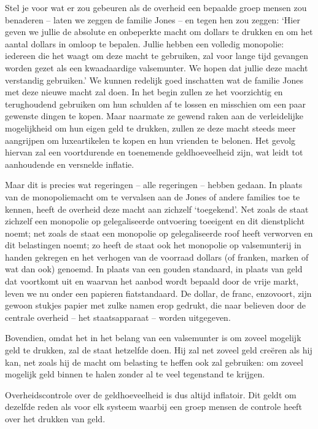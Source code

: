 \documentclass[
  a5paper,
  smalldemyvopaper,10pt,twoside,onecolumn,openright,extrafontsizes,hidelinks]{memoir}
\begin{document}
Stel je voor wat er zou gebeuren als de overheid een bepaalde groep
mensen zou benaderen -- laten we zeggen de familie Jones -- en tegen hen
zou zeggen: `Hier geven we jullie de absolute en onbeperkte macht om
dollars te drukken en om het aantal dollars in omloop te bepalen. Jullie
hebben een volledig monopolie: iedereen die het waagt om deze macht te
gebruiken, zal voor lange tijd gevangen worden gezet als een
kwaadaardige valsemunter. We hopen dat jullie deze macht verstandig
gebruiken.' We kunnen redelijk goed inschatten wat de familie Jones met
deze nieuwe macht zal doen. In het begin zullen ze het voorzichtig en
terughoudend gebruiken om hun schulden af te lossen en misschien om een
paar gewenste dingen te kopen. Maar naarmate ze gewend raken aan de
verleidelijke mogelijkheid om hun eigen geld te drukken, zullen ze deze
macht steeds meer aangrijpen om luxeartikelen te kopen en hun vrienden
te belonen. Het gevolg hiervan zal een voortdurende en toenemende
geldhoeveelheid zijn, wat leidt tot aanhoudende en versnelde inflatie.

Maar dit is precies wat regeringen -- alle regeringen -- hebben gedaan.
In plaats van de monopoliemacht om te vervalsen aan de Jones of andere
families toe te kennen, heeft de overheid deze macht aan zichzelf
`toegekend'. Net zoals de staat zichzelf een monopolie op gelegaliseerde
ontvoering toeeigent en dit dienstplicht noemt; net zoals de staat een
monopolie op gelegaliseerde roof heeft verworven en dit belastingen
noemt; zo heeft de staat ook het monopolie op valsemunterij in handen
gekregen en het verhogen van de voorraad dollars (of franken, marken of
wat dan ook) genoemd. In plaats van een gouden standaard, in plaats van
geld dat voortkomt uit en waarvan het aanbod wordt bepaald door de vrije
markt, leven we nu onder een papieren fiatstandaard. De dollar, de
franc, enzovoort, zijn gewoon stukjes papier met zulke namen erop
gedrukt, die naar believen door de centrale overheid -- het
staatsapparaat -- worden uitgegeven.

Bovendien, omdat het in het belang van een valsemunter is om zoveel
mogelijk geld te drukken, zal de staat hetzelfde doen. Hij zal net
zoveel geld creëren als hij kan, net zoals hij de macht om belasting te
heffen ook zal gebruiken: om zoveel mogelijk geld binnen te halen zonder
al te veel tegenstand te krijgen.

Overheidscontrole over de geldhoeveelheid is dus altijd inflatoir. Dit
geldt om dezelfde reden als voor elk systeem waarbij een groep mensen de
controle heeft over het drukken van geld.
\end{document}
